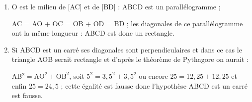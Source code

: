 
\medskip

%
%
%
%
%

\begin{enumerate}
\item %
O est le milieu de [AC] et de [BD] : ABCD est un parallélogramme ;

AC = AO + OC = OB + OD = BD ; les diagonales de ce parallélogramme ont la même longueur : ABCD est donc un rectangle.
\item %
Si ABCD est un carré ses diagonales sont perpendiculaires et dans ce cas le triangle AOB serait rectangle et d'après le théorème de Pythagore on aurait :

AB$^2 = \text{AO}^2 + \text{OB}^2$, soit $5^2 = 3,5^2 + 3,5^2$ ou encore $25 = 12,25 + 12,25$ et enfin $25 = 24,5$ ; cette égalité est fausse donc l'hypothèse ABCD est un carré est fausse.

\end{enumerate}

\bigskip

